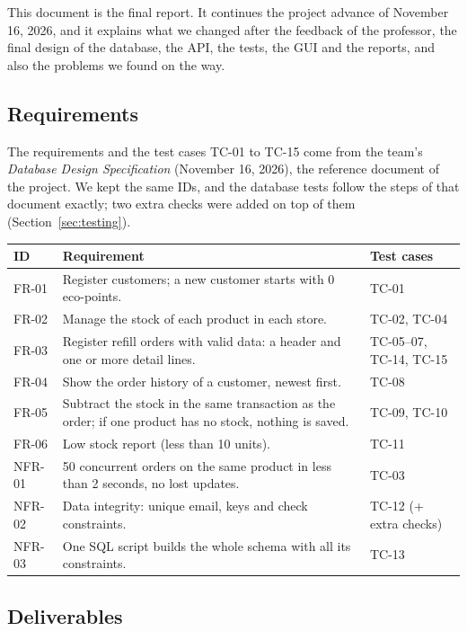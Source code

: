 \documentclass[11pt]{article}
\renewcommand{\_}{\oldus\allowbreak}
\begin{document}
This document is the final report. It continues the project advance of November 16, 2026, and it
explains what we changed after the feedback of the professor, the final design of the database,
the API, the tests, the GUI and the reports, and also the problems we found on the way.

\subsection{Requirements}

The requirements and the test cases TC-01 to TC-15 come from the team's \emph{Database Design
Specification} (November 16, 2026), the reference document of the project. We kept the same IDs, and
the database tests follow the steps of that document exactly; two extra checks were added on top of
them (Section~\ref{sec:testing}).

\begin{center}
\small
\begin{tabular}{p{1.4cm} p{10.4cm} p{2.6cm}}
\toprule
\textbf{ID} & \textbf{Requirement} & \textbf{Test cases} \\
\midrule
FR-01 & Register customers; a new customer starts with 0 eco-points. & TC-01 \\
FR-02 & Manage the stock of each product in each store. & TC-02, TC-04 \\
FR-03 & Register refill orders with valid data: a header and one or more detail lines. & TC-05--07, TC-14, TC-15 \\
FR-04 & Show the order history of a customer, newest first. & TC-08 \\
FR-05 & Subtract the stock in the same transaction as the order; if one product has no stock, nothing is saved. & TC-09, TC-10 \\
FR-06 & Low stock report (less than 10 units). & TC-11 \\
NFR-01 & 50 concurrent orders on the same product in less than 2 seconds, no lost updates. & TC-03 \\
NFR-02 & Data integrity: unique email, keys and check constraints. & TC-12 (+ extra checks) \\
NFR-03 & One SQL script builds the whole schema with all its constraints. & TC-13 \\
\bottomrule
\end{tabular}
\end{center}

\subsection{Deliverables}
\end{document}
